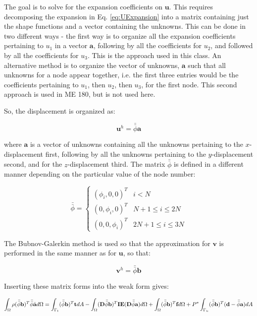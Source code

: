 \documentclass[10pt]{article}
\begin{document}
The goal is to solve for the expansion coefficients on \(\textbf{u}\). This requires decomposing the expansion in Eq. \eqref{eq:UExpansion} into a matrix containing just the shape functions and a vector containing the unknowns. This can be done in two different ways - the first way is to organize all the expansion coefficients pertaining to \(u_1\) in a vector \(\textbf{a}\), following by all the coefficients for \(u_2\), and followed by all the coefficients for \(u_3\). This is the approach used in this class. An alternative method is to organize the vector of unknowns, \(\textbf{a}\) such that all unknowns for a node appear together, i.e. the first three entries would be the coefficients pertaining to \(u_1\), then \(u_2\), then \(u_3\), for the first node. This second approach is used in ME 180, but is not used here.

So, the displacement is organized as:

\begin{equation}
\textbf{u}^h=\bar{\bar{\phi}}\textbf{a}
\end{equation}

where \(\textbf{a}\) is a vector of unknowns containing all the unknowns pertaining to the \(x\)-displacement first, following by all the unknowns pertaining to the \(y\)-displacement second, and for the \(z\)-displacement third. The matrix \(\bar{\bar{\phi}}\) is defined in a different manner depending on the particular value of the node number:

\begin{equation}
\bar{\bar{\phi}}=
\begin{cases}(\phi_i, 0, 0)^T & i < N\\(0, \phi_i, 0)^T & N+1\leq i\leq 2N \\ (0, 0, \phi_i)^T & 2N+1\leq i\leq 3N
\end{cases}
\end{equation}

The Bubnov-Galerkin method is used so that the approximation for \(\textbf{v}\) is performed in the same manner as for \(\textbf{u}\), so that:

\begin{equation}
\textbf{v}^h=\bar{\bar{\phi}}\textbf{b}
\end{equation}

Inserting these matrix forms into the weak form gives:

\begin{equation}
\int_{\Omega}\rho(\bar{\bar{\phi}}\textbf{b})^T\bar{\bar{\phi}}\ddot{\textbf{a}}d\Omega=\int_{\Gamma_t}(\bar{\bar{\phi}}\textbf{b})^T\textbf{t}dA- \int_{\Omega}(\textbf{D}\bar{\bar{\phi}}\textbf{b})^T\textbf{IE}(\textbf{D}\bar{\bar{\phi}}\textbf{a})d\Omega +\int_{\Omega}(\bar{\bar{\phi}}\textbf{b})^T\textbf{f}d\Omega+P^{*}\int_{\Gamma_u}(\bar{\bar{\phi}}\textbf{b})^T(\textbf{d}-\bar{\bar{\phi}}\textbf{a})dA\\
\end{equation}
\end{document}

